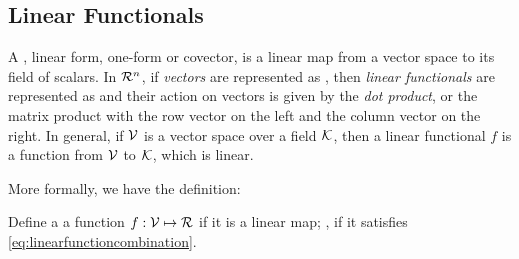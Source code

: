 \subsection{Linear Functionals}
A , \aka linear form, one-form or covector, is a linear map from a vector space to its field of scalars.  In $\mathcal{R}^{n}$, if \emph{vectors} are represented as , then \emph{linear functionals} are represented as  and their action on vectors is given by the \emph{dot product}, or the matrix product with the row vector on the left and the column vector on the right.  In general, if $\mathcal{V}$ is a vector space over a field $\mathcal{K}$, then a linear functional $f$ is a function from $\mathcal{V}$ to $\mathcal{K}$, which is linear. 

More formally, we have the definition:

\begin{definition}
Define a  a function ${f}:{\mathcal{V}}\mapsto{\mathcal{R}}$ if it is a linear map; \ie, if it satisfies \cref{eq:linearfunctioncombination}.
\end{definition}
